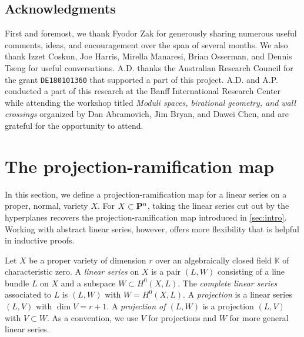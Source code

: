\documentclass[11pt,reqno]{amsart}
\theoremstyle{plain}
\theoremstyle{definition}
\theoremstyle{remark}
\numberwithin{equation}{section}
\renewcommand{\k}{\mathbb{K}}
\numberwithin{equation}{section}
\begin{document}

\subsection*{Acknowledgments}
First and foremost, we thank Fyodor Zak for generously sharing numerous useful comments, ideas, and encouragement over the span of several months.
We also thank Izzet Coskun, Joe Harris, Mirella Manaresi, Brian Osserman, and Dennis Tseng for useful conversations. 
A.D. thanks the Australian Research Council for the grant \texttt{DE180101360} that supported a part of this project.
A.D. and A.P. conducted a part of this research at the Banff International Research Center while attending the workshop titled \emph{Moduli spaces, birational geometry, and wall crossings} organized by Dan Abramovich, Jim Bryan, and Dawei Chen, and are grateful for the opportunity to attend.

\section{The projection-ramification map}\label{sec:prmap}
In this section, we define a projection-ramification map for a linear series on a proper, normal, variety $X$.
For $X \subset \P^n$, taking the linear series cut out by the hyperplanes recovers the projection-ramification map introduced in \autoref{sec:intro}.
Working with abstract linear series, however, offers more flexibility that is helpful in inductive proofs.

Let $X$ be a proper variety of dimension $r$ over an algebraically closed field $\k$ of characteristic zero.
A \emph{linear series} on $X$ is a pair $(L, W)$ consisting of a line bundle $L$ on $X$ and a subspace $W \subset H^0(X, L)$.
The \emph{complete linear series} associated to $L$ is $(L, W)$ with $W = H^0(X, L)$.
A \emph{projection} is a linear series $(L, V)$ with $\dim V = r+1$.
A \emph{projection of $(L, W)$} is a projection $(L, V)$ with $V \subset W$.
As a convention, we use $V$ for projections and $W$ for more general linear series.
\end{document}
